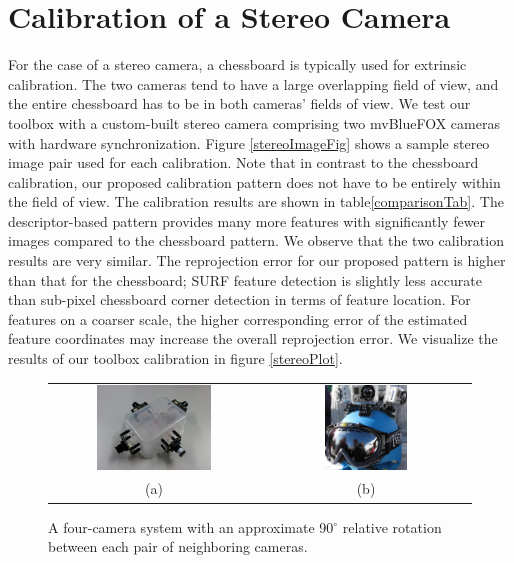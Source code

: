 \documentclass{report}
\begin{document}
\section{Calibration of a Stereo Camera}
For the case of a stereo camera, a chessboard is typically used for extrinsic calibration. The two cameras tend to have a large overlapping field of view, and the entire chessboard has to be in both cameras' fields of view. We test our toolbox with a custom-built stereo camera comprising two mvBlueFOX cameras with hardware synchronization. Figure \ref{stereoImageFig} shows a sample stereo image pair used for each calibration. Note that in contrast to the chessboard calibration, our proposed calibration pattern does not have to be entirely within the field of view. The calibration results are shown in table\ref{comparisonTab}. The descriptor-based pattern provides many more features with significantly fewer images compared to the chessboard pattern. We observe that the two calibration results are very similar. The reprojection error for our proposed pattern is higher than that for the chessboard; SURF feature detection is slightly less accurate than sub-pixel chessboard corner detection in terms of feature location. For features on a coarser scale, the higher corresponding error of the estimated feature coordinates may increase the overall reprojection error. We visualize the results of our toolbox calibration in figure \ref{stereoPlot}.

\setlength{\tabcolsep}{2pt}
\begin{figure}
\centering
\begin{tabular}{cc}
\includegraphics[width=0.574\textwidth]{images/fourcamerarig}&
\includegraphics[width=0.416\textwidth]{images/helmet} \\
(a) & (b)
\end{tabular}
\caption{A four-camera system with an approximate 90\ensuremath{^\circ} relative rotation between each pair of neighboring cameras.}
\label{cameraRigPhoto}
\end{figure}
\end{document}
